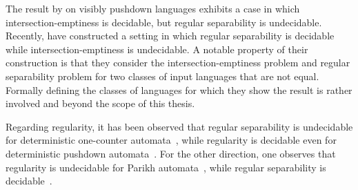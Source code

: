 \documentclass[../../diss.tex]{subfiles}
\begin{document}
The result by  on visibly pushdown languages exhibits a case in which intersection-emptiness is decidable, but regular separability is undecidable.
Recently,  have constructed a setting in which regular separability is decidable while intersection-emptiness is undecidable.
A notable property of their construction is that they consider the intersection-emptiness problem and regular separability problem for two classes of input languages that are not equal.
Formally defining the classes of languages for which they show the result is rather involved and beyond the scope of this thesis.

Regarding regularity, it has been observed that regular separability is undecidable for deterministic one-counter automata~\cite{CzerwinskiL17}, while regularity is decidable even for deterministic pushdown automata~\cite{Valiant75}.
For the other direction, one observes that regularity is undecidable for Parikh automata~\cite{CadilhacFM11}, while regular separability is decidable~\cite{ClementeCLP17}.
\end{document}
